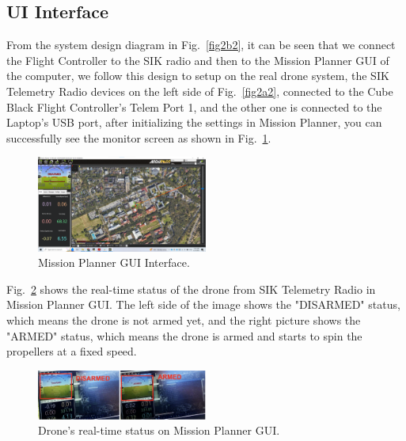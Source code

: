 \subsection{UI Interface}

From the system design diagram in Fig.~\ref{fig2b2}, it can be seen that we connect the Flight Controller to the SIK radio and then to the Mission Planner GUI of the computer, we follow this design to setup on the real drone system, the SIK Telemetry Radio devices on the left side of Fig.~\ref{fig2a2}, connected to the Cube Black Flight Controller's Telem Port 1, and the other one is connected to the Laptop's USB port, after initializing the settings in Mission Planner, you can successfully see the monitor screen as shown in Fig.~\ref{fig3e1}.

\begin{figure}[H]
    \centerline{\includegraphics[width=0.5\textwidth]{Figures/Results/Mission_Planner_GUI.png}}
    \caption{Mission Planner GUI Interface.}
    \label{fig3e1}
\end{figure}

Fig.~\ref{fig3e2} shows the real-time status of the drone from SIK Telemetry Radio in Mission Planner GUI. The left side of the image shows the "DISARMED" status, which means the drone is not armed yet, and the right picture shows the "ARMED" status, which means the drone is armed and starts to spin the propellers at a fixed speed.

\begin{figure}[H]
    \centerline{\includegraphics[width=0.5\textwidth]{Figures/Results/GUI_Status.png}}
    \caption{Drone's real-time status on Mission Planner GUI.}
    \label{fig3e2}
\end{figure}